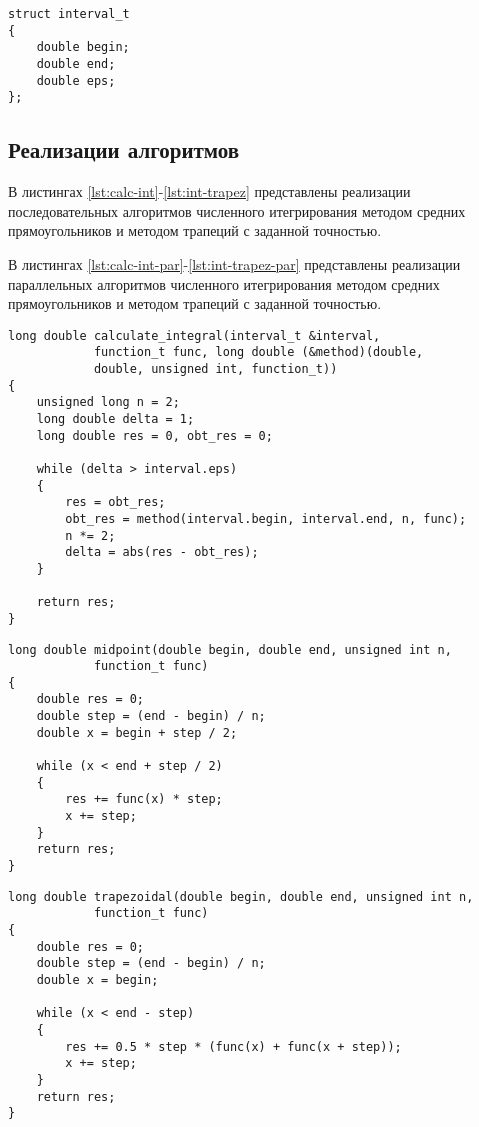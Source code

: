 \clearpage

\begin{lstlisting}[label=lst:interval, caption=Структура interval\_t]
struct interval_t
{
    double begin;
    double end;
    double eps;
};
\end{lstlisting}

\subsection{Реализации алгоритмов}
В листингах \ref{lst:calc-int}-\ref{lst:int-trapez} представлены реализации последовательных алгоритмов численного итегрирования методом средних прямоугольников и методом трапеций с заданной точностью. 

В листингах \ref{lst:calc-int-par}-\ref{lst:int-trapez-par} представлены реализации параллельных алгоритмов численного итегрирования методом средних прямоугольников и методом трапеций с заданной точностью. 

\clearpage

\begin{lstlisting}[label=lst:calc-int, caption=Последовательный алгоритм численного интегрирования с заданной точностью]
long double calculate_integral(interval_t &interval, 
            function_t func, long double (&method)(double, 
            double, unsigned int, function_t))
{
    unsigned long n = 2;
    long double delta = 1;
    long double res = 0, obt_res = 0;

    while (delta > interval.eps)
    {
        res = obt_res;
        obt_res = method(interval.begin, interval.end, n, func);
        n *= 2;
        delta = abs(res - obt_res);
    }

    return res;
}
\end{lstlisting}

\clearpage

\begin{lstlisting}[label=lst:int-midpoint, caption=Последовательный алгоритм численного интегрирования методом средних прямоугольников при заданном n]
long double midpoint(double begin, double end, unsigned int n, 
            function_t func)
{
    double res = 0;
    double step = (end - begin) / n;
    double x = begin + step / 2;

    while (x < end + step / 2)
    {
        res += func(x) * step;
        x += step;
    }
    return res;
}
\end{lstlisting}

\begin{lstlisting}[label=lst:int-trapez, caption=Последовательный алгоритм численного интегрирования методом трапеций при заданном n]
long double trapezoidal(double begin, double end, unsigned int n, 
            function_t func)
{
    double res = 0;
    double step = (end - begin) / n;
    double x = begin;

    while (x < end - step)
    {
        res += 0.5 * step * (func(x) + func(x + step));
        x += step;
    }
    return res;
}
\end{lstlisting}

